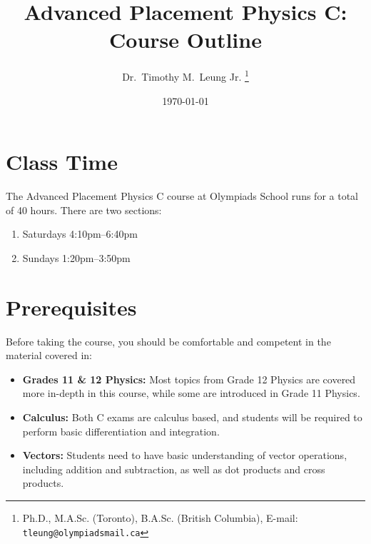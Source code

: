 \documentclass{../../oss-handout}
\title{Advanced Placement Physics C: Course Outline}
\author{Dr.\ Timothy M.\ Leung Jr.
  \footnote{Ph.D., M.A.Sc. (Toronto), B.A.Sc. (British Columbia), E-mail:
    \texttt{tleung@olympiadsmail.ca}}
}
\date{\today}
\begin{document}
\thispagestyle{title}
\gentitle

\section*{Class Time}
The Advanced Placement Physics C course at Olympiads School runs for a total of
40 hours. There are two sections:
\begin{enumerate}[nosep]
\item Saturdays 4:10pm--6:40pm
\item Sundays 1:20pm--3:50pm
\end{enumerate}

\section*{Prerequisites}
Before taking the course, you should be comfortable and competent in the
material covered in:
\begin{itemize}[nosep]
\item\textbf{Grades 11 \& 12 Physics:}
  Most topics from Grade 12 Physics are covered more in-depth in this course,
  while some are introduced in Grade 11 Physics.
\item\textbf{Calculus:} Both C exams are calculus based, and students will be
  required to perform basic differentiation and integration.
\item\textbf{Vectors:} Students need to have basic understanding of vector
  operations, including addition and subtraction, as well as dot products and
  cross products.
\end{itemize}
\end{document}
